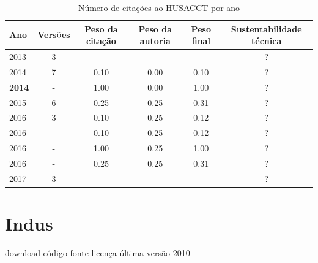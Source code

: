 \begin{table}[H]
\caption{Número de citações ao HUSACCT  por ano}
\centering
\begin{tabular}{| l | c | c | c | c | c |}
  \hline
  Ano & Versões & Peso da citação & Peso da autoria & Peso final & Sustentabilidade técnica \\
  \hline
        2013 & 3 & - & - & - & ? \\
\hline
            2014
          &
          7
          &
          0.10
          &
          0.00
          &
            {\color{red} 0.10}
          &
          ?
          \\
            {\bf 2014}
          &
          -
          &
          1.00
          &
          0.00
          &
            {\color{blue} 1.00}
          &
          ?
          \\
\hline
            2015
          &
          6
          &
          0.25
          &
          0.25
          &
            {\color{red} 0.31}
          &
          ?
          \\
\hline
            2016
          &
          3
          &
          0.10
          &
          0.25
          &
            {\color{red} 0.12}
          &
          ?
          \\
            2016
          &
          -
          &
          0.10
          &
          0.25
          &
            {\color{red} 0.12}
          &
          ?
          \\
            2016
          &
          -
          &
          1.00
          &
          0.25
          &
            {\color{blue} 1.00}
          &
          ?
          \\
            2016
          &
          -
          &
          0.25
          &
          0.25
          &
            {\color{red} 0.31}
          &
          ?
          \\
\hline
        2017 & 3 & - & - & - & ? \\
\hline
\end{tabular}
\end{table}



\section{Indus}
\checkmark download
\checkmark código fonte
\checkmark licença
\checkmark última versão 2010



